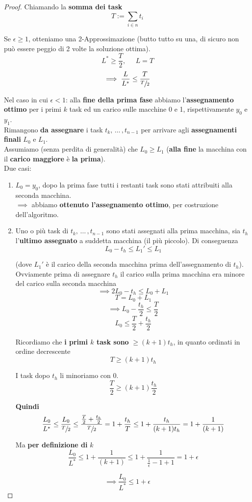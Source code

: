 \begin{proof}
	Chiamando la \textbf{somma dei task}
	$$ T := \sum_{i \in n} t_i$$
	
	Se $\epsilon \geq 1$, otteniamo una 2-Approssimazione (butto tutto su una, di sicuro non può essere peggio di 2 volte la soluzione ottima).
	$$ L^\ast \geq \frac{T}{2}, \;\;\;\;\; L = T $$
	$$\implies \frac{L}{L^\ast} \leq \frac{T}{\sfrac{T}{2}}$$
	
	Nel caso in cui $\epsilon < 1$: alla \textbf{fine della prima fase} abbiamo l'\textbf{assegnamento ottimo} per i primi $k$ task ed un carico sulle macchine 0 e 1, rispettivamente $y_0$ e $y_1$. \\
	
	Rimangono \textbf{da assegnare} i task $t_k, \, \dots \, , t_{n-1}$ per arrivare agli \textbf{assegnamenti finali} $L_0$ e $L_1$.\\
	
	Assumiamo (senza perdita di generalità) che $L_0 \geq L_1$ (\textbf{alla fine} la macchina con il \textbf{carico maggiore} è \textbf{la prima}).\\
	
	Due casi: 
	\begin{enumerate}
		\item $L_0 = y_0$, dopo la prima fase tutti i restanti task sono stati attribuiti alla seconda macchina.\\
		$\implies$ abbiamo \textbf{ottenuto l'assegnamento ottimo}, per costruzione dell'algoritmo.\\
		
		\item Uno o più task di $t_k, \, \dots \, , t_{n-1}$ sono stati assegnati alla prima macchina, sia $t_h$ l'\textbf{ultimo assegnato} a suddetta macchina (il più piccolo). Di conseguenza
		$$ L_0 - t_h \leq L_1' \leq L_1$$
		
		(dove $L_1'$ è il carico della seconda macchina prima dell'assegnamento di $t_h$). Ovviamente prima di assegnare $t_h$ il carico sulla prima macchina era minore del carico sulla seconda macchina
		$$ \implies 2L_0 - t_h \leq L_0 + L_1 $$
		$$ T = L_0 + L_1$$
		$$ \implies L_0 - \frac{t_h}{2} \leq \frac{T}{2} $$
		$$ L_0 \leq \frac{T}{2} + \frac{t_h}{2} $$
		
		Ricordiamo che \textbf{i primi $k$ task sono} $\geq (k+1) t_h$, in quanto ordinati in ordine decrescente
		$$ T \geq (k+1) t_h $$
		
		I task dopo $t_h$ li minoriamo con 0.
		$$ \frac{T}{2} \geq (k+1) \frac{t_h}{2} $$
		
		\textbf{Quindi}
		$$ \frac{L_0}{L^\ast} \leq \frac{L_0}{\sfrac{T}{2}} \leq \frac{\frac{T}{2} + \frac{t_h}{2}}{\sfrac{T}{2}} = 1 + \frac{t_h}{T} \leq 1 + \frac{t_h}{(k+1) t_h} = 1 + \frac{1}{(k+1)} $$
		
		Ma \textbf{per definizione di} $k$ 
		$$ \frac{L_0}{L^\ast} \leq 1 + \frac{1}{(k+1)} \leq 1 + \frac{1}{\frac{1}{\epsilon} - 1 + 1} = 1 + \epsilon $$
	\end{enumerate}
	$$ \implies  \frac{L_0}{L^\ast} \leq 1 + \epsilon $$
\end{proof}

